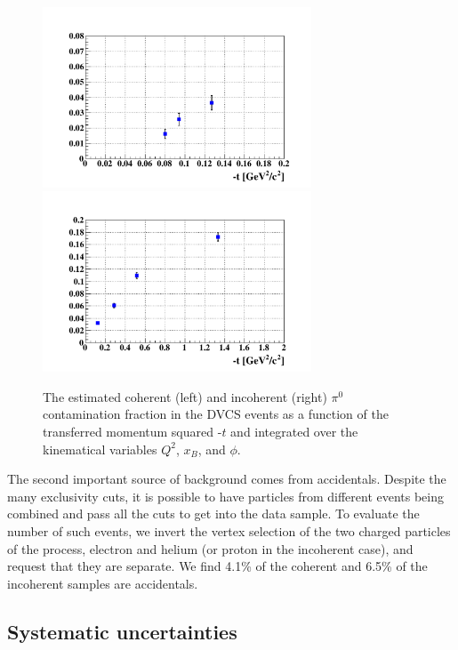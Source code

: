 \documentclass{article}
\begin{document}
\begin{figure}[tbp]
\includegraphics[width=8cm]{fig3/T_ratio_pi0_dvcs_Coh_t.pdf}
\includegraphics[width=8cm]{fig3/T_ratio_pi0_dvcs_InCoh_t.pdf}
\caption{The estimated coherent (left) and incoherent (right) $\pi^{0}$ 
contamination fraction in the DVCS events as a function of the 
transferred momentum squared -$t$ and integrated over the kinematical 
variables $Q^2$, $x_B$, and $\phi$.}
\label{fig:cont_yield}
\end{figure}

The second important source of background comes from accidentals. Despite the many exclusivity cuts, it is 
possible to have particles from different events being combined and pass all the cuts to get 
into the data sample. To evaluate the number of such events, we invert the vertex selection 
of the two charged 
particles of the process, electron and helium (or proton in the incoherent case), and request that they
are separate. We find 4.1\% of the coherent and 6.5\% of the incoherent samples are accidentals. 

\subsection{Systematic uncertainties}
\end{document}
